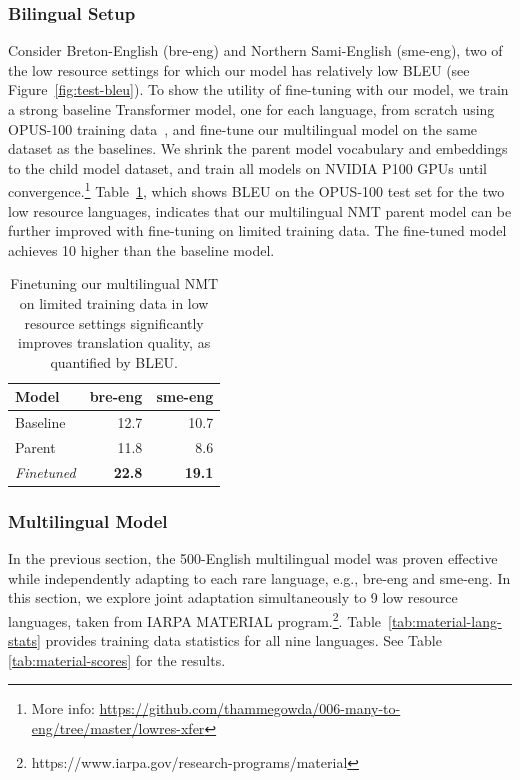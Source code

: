  \subsubsection{Bilingual Setup}
Consider Breton-English (bre-eng) and Northern Sami-English (sme-eng), two of the low resource settings for which our model has relatively low BLEU (see Figure~\ref{fig:test-bleu}). 
To show the utility of fine-tuning with our model, we train a strong baseline Transformer model, one for each language, from scratch using OPUS-100 training data~\cite{zhang-etal-2020-multiling-nmt}, and fine-tune our multilingual model on the same dataset as the baselines. We shrink the parent model vocabulary and embeddings to the child model dataset, and train all models on NVIDIA P100 GPUs until convergence.\footnote{More info: \url{https://github.com/thammegowda/006-many-to-eng/tree/master/lowres-xfer}}
 Table~\ref{tab:transfer-lowres}, which shows BLEU on the OPUS-100 test set for the two low resource languages, indicates that our multilingual NMT parent model can be further improved with fine-tuning on limited training data.
 The fine-tuned model achieves 10 \bleu{} higher than the baseline model.

\begin{table}[ht]
    \centering
    \begin{tabular}{l  r r}
        Model     & bre-eng & sme-eng \\ \hline\hline
        Baseline  & 12.7  &  10.7  \\
        Parent    & 11.8  &  8.6  \\
        \textit{Finetuned} & \textbf{22.8}  & \textbf{19.1}  \\ 
    \end{tabular}
    \caption{Finetuning our multilingual NMT on limited training data in low resource settings significantly improves translation quality, as quantified by BLEU.}
    \label{tab:transfer-lowres}
\end{table}

\subsubsection{Multilingual Model}
In the previous section, the 500-English multilingual model was proven effective while independently adapting to each rare language, e.g., bre-eng and sme-eng. 
In this section, we explore joint adaptation simultaneously to 9 low resource languages, taken from IARPA MATERIAL program.\footnote{https://www.iarpa.gov/research-programs/material}.
Table~\ref{tab:material-lang-stats} provides training data statistics for all nine languages. 
See Table \ref{tab:material-scores} for the results.

